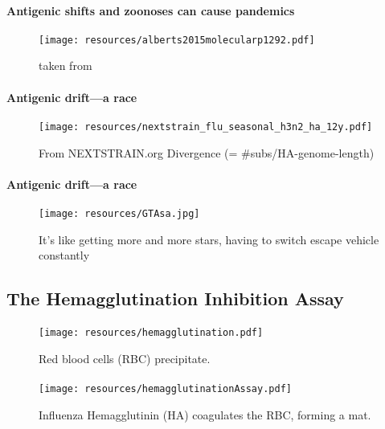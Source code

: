 \documentclass{beamer}
\begin{document}
\begin{darkframes}
    \begin{frame}{\subsecname}
      \framesubtitle{Antigenic shifts and zoonoses can cause pandemics}
      \begin{figure}
        \texttt{[image: resources/alberts2015molecularp1292.pdf]}
        \caption{taken from \cite{alberts15}}
      \end{figure}{}
    \end{frame}{}

    \begin{frame}{\subsecname}
      \framesubtitle{Antigenic drift---a race}
      \begin{figure}
        \texttt{[image: resources/nextstrain\_flu\_seasonal\_h3n2\_ha\_12y.pdf]}
        \caption{\footnotesize From NEXTSTRAIN.org Divergence (= #subs/HA-genome-length)}
      \end{figure}
    \end{frame}

    \begin{frame}{\subsecname}
      \framesubtitle{Antigenic drift---a race}
      \begin{figure}
        \texttt{[image: resources/GTAsa.jpg]}
        \caption{\footnotesize It's like getting more and more stars, having to switch escape vehicle constantly}
      \end{figure}
    \end{frame}

    \subsection{The Hemagglutination Inhibition Assay}
    \begin{frame}{\subsecname}
      \framesubtitle{}
      \begin{figure}
        \texttt{[image: resources/hemagglutination.pdf]}
        \caption{Red blood cells (RBC) precipitate.}
      \end{figure}
    \end{frame}

    \begin{frame}{\subsecname}
      \framesubtitle{}
      \begin{figure}
        \texttt{[image: resources/hemagglutinationAssay.pdf]}
        \caption{Influenza Hemagglutinin (HA) coagulates the RBC, forming a mat.}
      \end{figure}
    \end{frame}


\end{darkframes}
\end{document}
